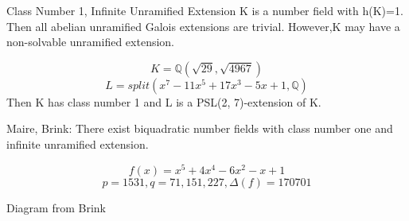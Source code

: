 \documentclass[10pt]{beamer}
\theoremstyle{plain} %
\begin{document}
\begin{frame}{Class Number 1, Infinite Unramified Extension}
K is a number field with h(K)=1. Then all abelian unramified Galois extensions are trivial. However,K may have a non-solvable unramified extension.
\begin{example}[Brink]
\begin{equation}
   K=\mathbb{Q}(\sqrt{29},\sqrt{4967}) 
\end{equation}
\begin{equation}
   L=split(x^7 - 11x^5 + 17x^3 - 5x + 1,\mathbb{Q})
\end{equation}
Then K has class number 1 and L is a PSL(2, 7)-extension of K.
\end{example}
Maire, Brink: There exist biquadratic number fields with class number one and infinite unramified extension.
\begin{example}
\begin{equation}
    f(x)=x^5+4x^4-6x^2-x+1
    \end{equation}
    \begin{equation}
p=1531,q=71,151,227,\Delta(f)=170701
\end{equation}
\end{example}
\end{frame}
\begin{frame}{Diagram from Brink}
    \begin{center}
\end{center}
\end{frame}
\end{document}
